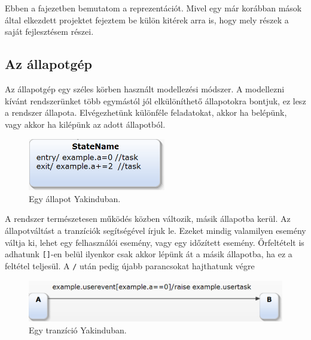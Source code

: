 \chapter{\pojo}
\label{sec:pojochapter}

Ebben a fajezetben bemutatom a {\thetaSc} reprezentációt. Mivel egy már korábban mások által elkezdett projektet fejeztem be külön kitérek arra is, hogy mely részek a saját fejlesztésem részei.
\section{Az állapotgép}
Az állapotgép egy széles körben használt modellezési módszer. A modellezni kívánt rendszerünket több egymástól jól elkülöníthető állapotokra bontjuk, ez lesz a rendszer állapota. Elvégezhetünk különféle feladatokat, akkor ha belépünk, vagy akkor ha kilépünk az adott állapotból.

\begin{figure} [!ht]
\centering
\includegraphics[width=60mm, keepaspectratio]{figures/state.png}
\caption{\label{fig:state}Egy állapot Yakinduban.}
\end{figure}

A rendszer természetesen működés közben változik, másik állapotba kerül. Az állapotváltást a tranzíciók segítségével írjuk le. Ezeket mindig valamilyen esemény váltja ki, lehet egy felhasználói esemény, vagy egy időzített esemény. Őrfeltételt is adhatunk \verb+[]+-en belül ilyenkor csak akkor lépünk át a másik állapotba, ha ez a feltétel teljesül. A \verb+/+ után pedig újabb parancsokat hajthatunk végre

\begin{figure} [!ht]
 	\centering
 	\includegraphics[width=150mm, keepaspectratio]{figures/transition.png}
 	\caption{\label{fig:transition}Egy tranzíció Yakinduban.}
\end{figure}

